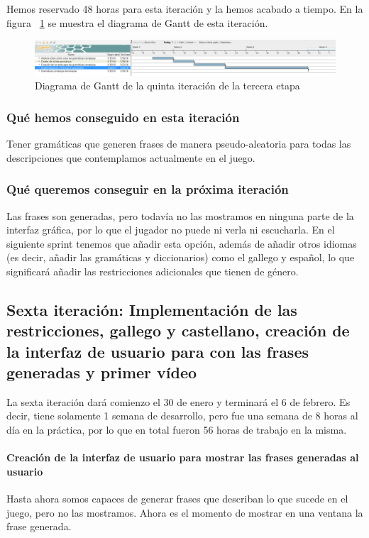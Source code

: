 Hemos reservado 48 horas para esta iteración y la hemos acabado a tiempo. En la figura ~\ref{fig:sec3it5} se muestra el diagrama de Gantt de esta iteración.

\begin{figure}
    \includegraphics[width=\textwidth,height=\textheight,keepaspectratio]{./img/sec3it5.png}
  \caption{Diagrama de Gantt de la quinta iteración de la tercera etapa}
  \label{fig:sec3it5}
\end{figure}

\subsubsection{Qué hemos conseguido en esta iteración}

Tener gramáticas que generen frases de manera pseudo-aleatoria para todas las descripciones que contemplamos actualmente en el juego.

\subsubsection{Qué queremos conseguir en la próxima iteración}

Las frases son generadas, pero todavía no las mostramos en ninguna parte de la interfaz gráfica, por lo que el jugador no puede ni verla ni escucharla. En el siguiente sprint tenemos que añadir esta opción, además de añadir otros idiomas (es decir, añadir las gramáticas y diccionarios) como el gallego y español, lo que significará añadir las restricciones adicionales que tienen de género.

\subsection{Sexta iteración: Implementación de las restricciones, gallego y castellano, creación de la interfaz de usuario para con las frases generadas y primer vídeo}

La sexta iteración dará comienzo el 30 de enero y terminará el 6 de febrero. Es decir, tiene solamente 1 semana de desarrollo, pero fue una semana de 8 horas al día en la práctica, por lo que en total fueron 56 horas de trabajo en la misma.

\paragraph{Creación de la interfaz de usuario para mostrar las frases generadas al usuario} Hasta ahora somos capaces de generar frases que describan lo que sucede en el juego, pero no las mostramos. Ahora es el momento de mostrar en una ventana la frase generada.

